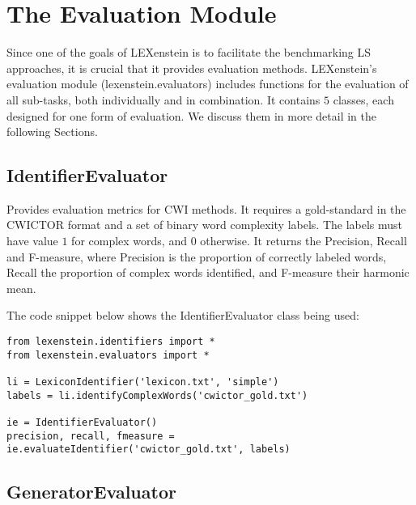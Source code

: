 \chapter{The Evaluation Module}

Since one of the goals of LEXenstein is to facilitate the benchmarking LS approaches, it is crucial that it provides evaluation methods. LEXenstein's evaluation module (lexenstein.evaluators) includes functions for the evaluation of all sub-tasks, both individually and in combination. It contains $5$ classes, each designed for one form of evaluation. We discuss them in more detail in the following Sections.









\section{IdentifierEvaluator}

Provides evaluation metrics for CWI methods. It requires a gold-standard in the CWICTOR format and a set of binary word complexity labels. The labels must have value $1$ for complex words, and $0$ otherwise. It returns the Precision, Recall and F-measure, where Precision is the proportion of correctly labeled words, Recall the proportion of complex words identified, and F-measure their harmonic mean.

The code snippet below shows the IdentifierEvaluator class being used:

\begin{lstlisting}
from lexenstein.identifiers import *
from lexenstein.evaluators import *

li = LexiconIdentifier('lexicon.txt', 'simple')
labels = li.identifyComplexWords('cwictor_gold.txt')

ie = IdentifierEvaluator()
precision, recall, fmeasure = ie.evaluateIdentifier('cwictor_gold.txt', labels)
\end{lstlisting}













\section{GeneratorEvaluator}

